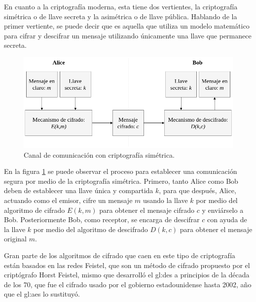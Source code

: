   En cuanto a la criptografía moderna, esta tiene dos vertientes, la
  criptografía simétrica o de llave secreta y la asimétrica o de llave
  pública. Hablando de la primer vertiente, se puede decir que es aquella
  que utiliza un modelo matemático para cifrar y descifrar un mensaje
  utilizando únicamente una llave que permanece secreta.

  \begin{figure}[H]
    \begin{center}
      \includegraphics[width=0.8\linewidth]
        {contenidos/antecedentes/intro/img/cripto_simetrica.png}
      \caption{Canal de comunicación con criptografía simétrica.}
      \label{cripto_simetrica}
    \end{center}
  \end{figure}

  En la figura \ref{cripto_simetrica} se puede observar el proceso para 
  establecer una comunicación segura por medio de la criptografía simétrica. 
  Primero, tanto Alice como Bob deben de establecer una llave única y 
  compartida $k$, para que después, Alice, actuando como el emisor, cifre un 
  mensaje $m$ usando la llave $k$ por medio del algoritmo de cifrado $E(k,m)$ 
  para obtener el mensaje cifrado $c$ y enviárselo a Bob. Posteriormente Bob, 
  como receptor, se encarga de descifrar $c$ con ayuda de la llave $k$ por 
  medio del algoritmo de descifrado $D(k,c)$ para obtener el mensaje original 
  $m$.


  Gran parte de los algoritmos de cifrado que caen en este tipo de criptografía 
  están basados en las redes Feistel, que son un método de cifrado propuesto 
  por el criptógrafo Horst Feistel, mismo que desarrolló el \acrfull{gl:des} a 
  principios de la década de los 70, que fue el cifrado usado por el gobierno 
  estadounidense hasta 2002, año que el \acrfull{gl:aes} lo sustituyó. 

